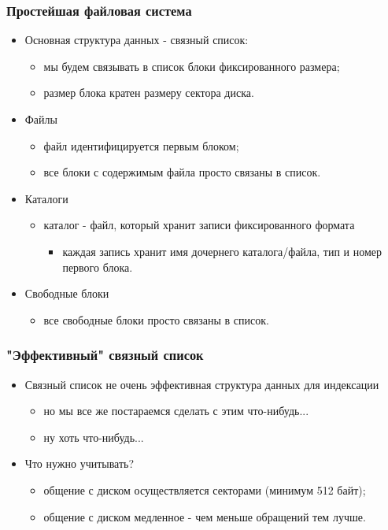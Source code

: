 \begin{frame}
\frametitle{Простейшая файловая система}
\begin{itemize}
  \item Основная структура данных - связный список:
  \begin{itemize}
    \item мы будем связывать в список блоки фиксированного размера;
    \item размер блока кратен размеру сектора диска.
  \end{itemize}
  \item Файлы
  \begin{itemize}
    \item файл идентифицируется первым блоком;
    \item все блоки с содержимым файла просто связаны в список.
  \end{itemize}
  \item Каталоги
  \begin{itemize}
    \item каталог - файл, который хранит записи фиксированного формата
    \begin{itemize}
      \item каждая запись хранит имя дочернего каталога/файла, тип и номер
      первого блока.
    \end{itemize}
  \end{itemize}
  \item Свободные блоки
  \begin{itemize}
    \item все свободные блоки просто связаны в список.
  \end{itemize}
\end{itemize}
\end{frame}

\begin{frame}
\frametitle{"Эффективный" связный список}
\begin{itemize}
  \item Связный список не очень эффективная структура данных для индексации
  \begin{itemize}
    \item но мы все же постараемся сделать с этим что-нибудь...
    \item ну хоть что-нибудь...
  \end{itemize}
  \item Что нужно учитывать?
  \begin{itemize}
    \item общение с диском осуществляется секторами (минимум 512 байт);
    \item общение с диском медленное - чем меньше обращений тем лучше.
  \end{itemize}
\end{itemize}
\end{frame}

